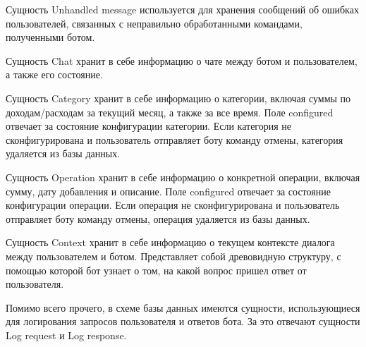 Сущность Unhandled message используется для хранения сообщений об ошибках пользователей, связанных с неправильно обработанными командами, полученными ботом.

Сущность Chat хранит в себе информацию о чате между ботом и пользователем, а также его состояние.

\newpage

Сущность Category хранит в себе информацию о категории, включая суммы по доходам/расходам за текущий месяц, а также за все время. Поле configured отвечает за состояние конфигурации категории. Если категория не сконфигурирована и пользователь отправляет боту команду отмены, категория удаляется из базы данных.

Сущность Operation хранит в себе информацию о конкретной операции, включая сумму, дату добавления и описание. Поле configured отвечает за состояние конфигурации операции. Если операция не сконфигурирована и пользователь отправляет боту команду отмены, операция удаляется из базы данных.

Сущность Context хранит в себе информацию о текущем контексте диалога между пользователем и ботом. Представляет собой древовидную структуру, с помощью которой бот узнает о том, на какой вопрос пришел ответ от пользователя.

Помимо всего прочего, в схеме базы данных имеются сущности, использующиеся для логирования запросов пользователя и ответов бота. За это отвечают сущности Log request и Log response.